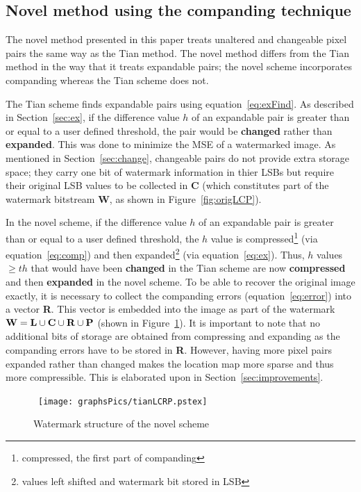 \documentclass[10pt,twocolumn,letterpaper]{article}
\begin{document}
{\subsection{Novel method using the companding technique}
\label{sec:novelCompand}
The novel method presented in this paper treats unaltered and changeable pixel pairs the same way as the Tian method.
The novel method differs from the Tian method in the way that it treats expandable pairs; 
the novel scheme incorporates companding 
whereas the Tian scheme does not.

The Tian scheme finds expandable pairs using equation~\ref{eq:exFind}.
As described in Section~\ref{sec:ex}, if the difference value $h$ of an expandable pair is greater than 
or equal to a user defined threshold, the pair would be {\bf changed} rather than {\bf expanded}. 
This was done to minimize the MSE of a watermarked image. 
As mentioned in Section~\ref{sec:change}, changeable pairs
do not provide extra storage space; they carry one bit of watermark
information in thier LSBs
but require their original LSB values to be collected in {\bf C}
(which constitutes part of the watermark bitstream {\bf W}, as shown in Figure~\ref{fig:origLCP}).

In the novel scheme, if the difference value $h$ of an expandable pair is greater than
or equal to a user defined threshold, the $h$ value is compressed\footnote{compressed, the 
first part of companding} (via equation~\ref{eq:comp}) and then expanded\footnote{values left 
shifted and watermark bit stored in LSB}
(via equation~\ref{eq:ex}). Thus, $h$ values $\geq th$ that would have been {\bf changed} in the Tian scheme are now 
{\bf compressed} and then {\bf expanded}
in the novel scheme. 
To be able to recover the original image exactly, 
it is necessary to collect the companding errors (equation~\ref{eq:error}) into 
a vector {\bf R}. This vector is embedded into the image as part of the watermark
$\mbox{{\bf W}} = \mbox{{\bf L}} \cup \mbox{{\bf C}} \cup \mbox{{\bf R}} \cup \mbox{{\bf P}}$ (shown in Figure~\ref{fig:tianLCRP}).
It is important to note that no additional bits of storage are obtained from compressing and expanding as the companding errors
have to be stored in {\bf R}. However, having more pixel pairs expanded rather than changed makes the location map more sparse and
thus more compressible. This is elaborated upon in Section~\ref{sec:improvements}.

\begin{figure}[!htb]
\centerline{ \hbox{
        \texttt{[image: graphsPics/tianLCRP.pstex]}
}}
        \caption{Watermark structure of the novel scheme}
        \label{fig:tianLCRP}
\setlength{\abovecaptionskip}{0cm}
\end{figure}

}
\end{document}
